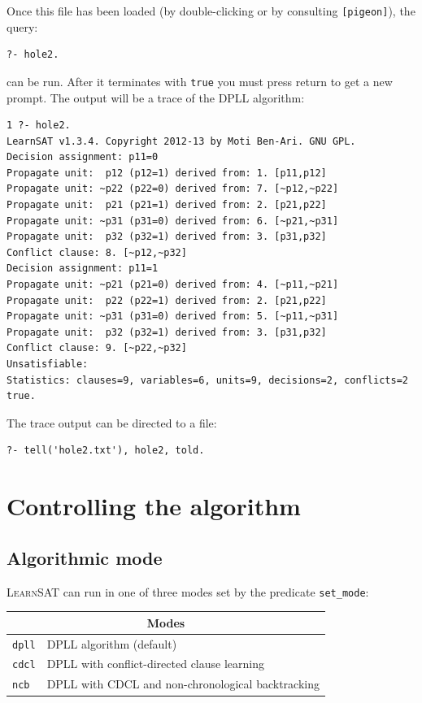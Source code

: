 \documentclass[11pt]{article}
\newcommand*{\p}[1]{\textup{\texttt{#1}}}
\newcommand*{\ls}{\textsc{LearnSAT}}
\begin{document}
\newpage

Once this file has been loaded (by double-clicking or by consulting
\p{[pigeon]}), the query:
\begin{verbatim}
?- hole2. 
\end{verbatim}
can be run. After it terminates with \p{true} you must press
return to get a new prompt. The output will be a trace of the DPLL
algorithm:

\begin{verbatim}
1 ?- hole2.
LearnSAT v1.3.4. Copyright 2012-13 by Moti Ben-Ari. GNU GPL.
Decision assignment: p11=0
Propagate unit:  p12 (p12=1) derived from: 1. [p11,p12]
Propagate unit: ~p22 (p22=0) derived from: 7. [~p12,~p22]
Propagate unit:  p21 (p21=1) derived from: 2. [p21,p22]
Propagate unit: ~p31 (p31=0) derived from: 6. [~p21,~p31]
Propagate unit:  p32 (p32=1) derived from: 3. [p31,p32]
Conflict clause: 8. [~p12,~p32]
Decision assignment: p11=1
Propagate unit: ~p21 (p21=0) derived from: 4. [~p11,~p21]
Propagate unit:  p22 (p22=1) derived from: 2. [p21,p22]
Propagate unit: ~p31 (p31=0) derived from: 5. [~p11,~p31]
Propagate unit:  p32 (p32=1) derived from: 3. [p31,p32]
Conflict clause: 9. [~p22,~p32]
Unsatisfiable:
Statistics: clauses=9, variables=6, units=9, decisions=2, conflicts=2
true.
\end{verbatim}

The trace output can be directed to a file:

\begin{verbatim}
?- tell('hole2.txt'), hole2, told.
\end{verbatim}

\newpage

\section{Controlling the algorithm}

\subsection{Algorithmic mode}

\ls{} can run in one of three modes set by the predicate \p{set\_mode}:

\begin{center}
\begin{tabular}{|l|l|}
\hline
\multicolumn{2}{|c|}{\textbf{\large Modes}}\\
\hline
\p{dpll} & DPLL algorithm (default)\\
\p{cdcl} & DPLL with conflict-directed clause learning\\
\p{ncb} &  DPLL with CDCL and non-chronological backtracking\\
\hline
\end{tabular}
\end{center}
\end{document}
